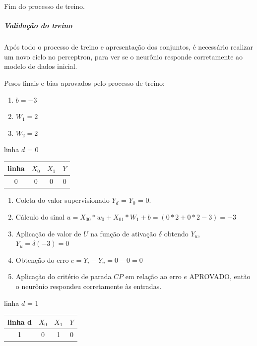 \documentclass[	12pt, Times, openright, twoside, a4paper, english, brazil]{abntex2}
\begin{document}
            	Fim do processo de treino.
            
            \subparagraph* {Validação do treino}
            	Após todo o processo de treino e apresentação dos conjuntos, é necessário realizar um novo ciclo no perceptron, para ver se o neurônio responde corretamente ao modelo de dados inicial.
            	
            	Pesos finais e bias aprovados pelo processo de treino:
            	\begin{enumerate}
            		\item $b=  -3$  					
            		\item $W_1= 2$ 
            		\item $W_2= 2$
            	\end{enumerate}
            	
                linha $d$ = 0\\
                    \begin{table}[!ht]
                    \centering
    				\begin{tabular}{|c|c|c|c|}
    					\hline  \textbf{linha} & \textbf{$X_0$} & \textbf{$X_1$} &  \textbf{$Y$}\\
  				 	    \hline 0 & 0 & 0 & 0\\
    				\end{tabular}
    				\end{table}
    				
            	\begin{enumerate}
            	    \item Coleta do valor supervisionado $Y_d$ = $Y_0$ = 0.
            		\item Cálculo do sinal $u = X_{00}*w_0 + X_{01}*W_1 +b = (0*2 + 0*2 -3) = -3$
            		\item Aplicação de valor de $U$ na função de ativação $\delta$ obtendo $Y_u$, $Y_u = \delta(-3) = 0$
            		\item Obtenção do erro $e = Y_i-Y_u = 0 - 0 = 0$
            		\item Aplicação do critério de parada $CP$ em relação ao erro $e$ APROVADO, então o neurônio respondeu corretamente às entradas.
            	\end{enumerate}
            	
                linha $d$ = 1\\
                    \begin{table}[!ht]
                    \centering
    				\begin{tabular}{|c|c|c|c|}
    					\hline  \textbf{linha d} & \textbf{$X_0$} & \textbf{$X_1$} &  \textbf{$Y$}\\
  				 	    \hline 1 & 0 & 1 & 0\\
    				\end{tabular}
    				\end{table}
    				
\end{document}
